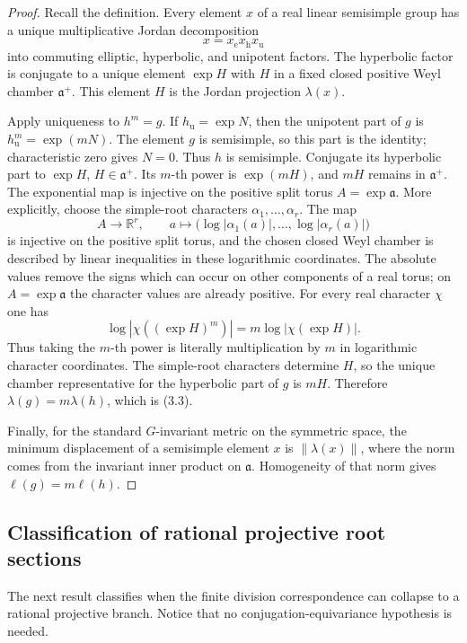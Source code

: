 \documentclass[11pt,reqno]{amsart}
\theoremstyle{definition}
\theoremstyle{remark}
\newcommand{\R}{\mathbb R}
\begin{document}
\begin{proof}
Recall the definition.  Every element \(x\) of a real linear semisimple
group has a unique multiplicative Jordan decomposition
\[
 x=x_{\mathrm e}x_{\mathrm h}x_{\mathrm u}
\]
into commuting elliptic, hyperbolic, and unipotent factors.  The hyperbolic
factor is conjugate to a unique element \(\exp H\) with \(H\) in a fixed
closed positive Weyl chamber \(\mathfrak a^+\).  This element
\(H\) is the Jordan projection \(\lambda(x)\).

Apply uniqueness to \(h^m=g\).  If
\(h_{\mathrm u}=\exp N\), then the unipotent part of \(g\) is
\(h_{\mathrm u}^m=\exp(mN)\).  The element \(g\) is semisimple, so this part
is the identity; characteristic zero gives \(N=0\).  Thus \(h\) is
semisimple.  Conjugate its hyperbolic part to
\(\exp H\), \(H\in\mathfrak a^+\).  Its \(m\)-th power is
\(\exp(mH)\), and \(mH\) remains in \(\mathfrak a^+\).
The exponential map is injective on the positive split torus
\(A=\exp\mathfrak a\).  More explicitly, choose the simple-root characters
\(\alpha_1,\ldots,\alpha_r\).  The map
\[
 A\longrightarrow\R^r,\qquad
 a\longmapsto
   \bigl(\log|\alpha_1(a)|,\ldots,\log|\alpha_r(a)|\bigr)
\]
is injective on the positive split torus, and the chosen closed Weyl chamber
is described by linear inequalities in these logarithmic coordinates.  The
absolute values remove the signs which can occur on other components of a
real torus; on \(A=\exp\mathfrak a\) the character values are already
positive.  For every real character \(\chi\) one has
\[
 \log|\chi((\exp H)^m)|
   =m\log|\chi(\exp H)|.
\]
Thus taking the \(m\)-th power is literally multiplication by \(m\) in
logarithmic character coordinates.  The simple-root characters determine
\(H\), so the unique chamber
representative for the hyperbolic part of \(g\) is \(mH\).  Therefore
\(\lambda(g)=m\lambda(h)\), which is (3.3).

Finally, for the standard \(G\)-invariant metric on the symmetric space,
the minimum displacement of a semisimple element \(x\) is
\(\|\lambda(x)\|\), where the norm comes from the invariant inner product
on \(\mathfrak a\).  Homogeneity of that norm gives
\(\ell(g)=m\ell(h)\).
\end{proof}

\subsection{Classification of rational projective root sections}

The next result classifies when the finite division correspondence can
collapse to a rational projective branch.  Notice that no
conjugation-equivariance hypothesis is needed.
\end{document}
